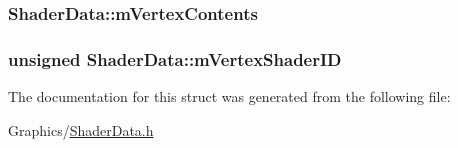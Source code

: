 \subsubsection[{\texorpdfstring{m\+Vertex\+Contents}{mVertexContents}}]{ Shader\+Data\+::m\+Vertex\+Contents}\hypertarget{structShaderData_a7fb89e1c0ac26b3ea9178df7844f8d59}{}\label{structShaderData_a7fb89e1c0ac26b3ea9178df7844f8d59}
\subsubsection[{\texorpdfstring{m\+Vertex\+Shader\+ID}{mVertexShaderID}}]{\setlength{\rightskip}{0pt plus 5cm}unsigned Shader\+Data\+::m\+Vertex\+Shader\+ID}\hypertarget{structShaderData_adf4a1030e9303fb8de7c88788c5b112e}{}\label{structShaderData_adf4a1030e9303fb8de7c88788c5b112e}


The documentation for this struct was generated from the following file\+:\begin{DoxyCompactItemize}
\item 
Graphics/\hyperlink{ShaderData_8h}{Shader\+Data.\+h}\end{DoxyCompactItemize}
